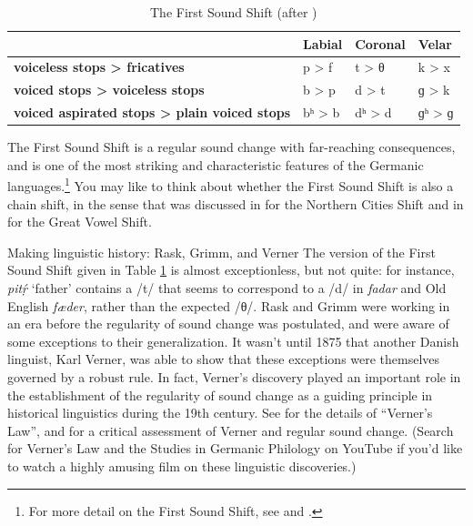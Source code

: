 \begin{table}
        \begin{tabular}{llll}
        \lsptoprule
     & \textbf{Labial} & \textbf{Coronal} & \textbf{Velar} \\
     \midrule
    \textbf{voiceless stops > fricatives} & p > f & t > θ & k > x \\
    \textbf{voiced stops > voiceless stops} & b > p & d > t & ɡ > k \\
    \textbf{voiced aspirated stops > plain voiced stops} & bʰ > b & dʰ > d & ɡʰ > ɡ \\
    \midrule
\end{tabular}
    \caption{The First Sound Shift (after \citealp[42]{Campbell2013})}
    \label{tab:first_Sound_Shift}
\end{table}

\noindent The First Sound Shift is a regular sound change with far-reaching consequences, and is one of the most striking and characteristic features of the Germanic languages.\footnote{For more detail on the First Sound Shift, see \citet[§3.2.4]{Ringe2017} and \citet[§6.4--§6.7]{Fulk2018}.} You may like to think about whether the First Sound Shift is also a chain shift, in the sense that was discussed in  for the Northern Cities Shift and in  for the Great Vowel Shift.


\begin{peoplebox}{Making linguistic history: Rask, Grimm, and Verner}
The version of the First Sound Shift given in Table \ref{tab:first_Sound_Shift} is almost exceptionless, but not quite: for instance,  \emph{pitṛ́} `father' contains a /t/ that seems to correspond to a /d/ in  \emph{fadar} and Old English \emph{fæder}, rather than the expected /θ/. Rask and Grimm were working in an era before the regularity of sound change was postulated, and were aware of some exceptions to their generalization. It wasn't until 1875 that another Danish linguist, Karl Verner, was able to show that these exceptions were themselves governed by a robust rule. In fact, Verner's discovery played an important role in the establishment of the regularity of sound change as a guiding principle in historical linguistics during the 19th century. See \citet[140--142]{Campbell2013} for the details of ``Verner's Law'', and \citet[132--135]{Lass1997} for a critical assessment of Verner and regular sound change. (Search for Verner's Law and the Studies in Germanic Philology on YouTube if you'd like to watch a highly amusing film on these linguistic discoveries.)
\end{peoplebox}


